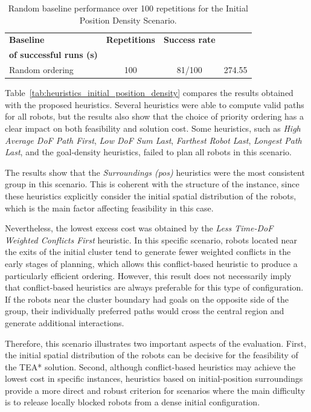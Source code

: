 \begin{table}[H]
\centering
\caption{Random baseline performance over 100 repetitions for the Initial Position Density Scenario.}
\label{tab:random_baseline_initial_position_density}
\footnotesize
\setlength{\tabcolsep}{6pt}
\begin{tabular}{@{}lccc@{}}
\toprule
\textbf{Baseline} & \textbf{Repetitions} & \textbf{Success rate} & \makecell{\textbf{Mean excess cost}\\\textbf{of successful runs (s)}} \\
\midrule
Random ordering & 100 & 81/100 & 274.55 \\
\bottomrule
\end{tabular}
\end{table}

Table~\ref{tab:heuristics_initial_position_density} compares the results obtained with the proposed
heuristics. Several heuristics were able to compute valid paths for all robots, but the results also
show that the choice of priority ordering has a clear impact on both feasibility and solution cost.
Some heuristics, such as \textit{High Average DoF Path First}, \textit{Low DoF Sum Last},
\textit{Farthest Robot Last}, \textit{Longest Path Last}, and the goal-density heuristics, failed to
plan all robots in this scenario.

The results show that the \textit{Surroundings (pos)} heuristics were the most consistent group in
this scenario. This is coherent with the structure of the instance, since these heuristics explicitly
consider the initial spatial distribution of the robots, which is the main factor affecting feasibility
in this case.

Nevertheless, the lowest excess cost was obtained by the \textit{Less Time-DoF Weighted Conflicts
First} heuristic. In this specific scenario, robots located near the exits of the initial cluster tend to
generate fewer weighted conflicts in the early stages of planning, which allows this conflict-based
heuristic to produce a particularly efficient ordering. However, this result does not necessarily imply
that conflict-based heuristics are always preferable for this type of configuration. If the robots near
the cluster boundary had goals on the opposite side of the group, their individually preferred paths
would cross the central region and generate additional interactions.

Therefore, this scenario illustrates two important aspects of the evaluation. First, the initial spatial
distribution of the robots can be decisive for the feasibility of the TEA* solution. Second, although
conflict-based heuristics may achieve the lowest cost in specific instances, heuristics based on
initial-position surroundings provide a more direct and robust criterion for scenarios where the main
difficulty is to release locally blocked robots from a dense initial configuration.


